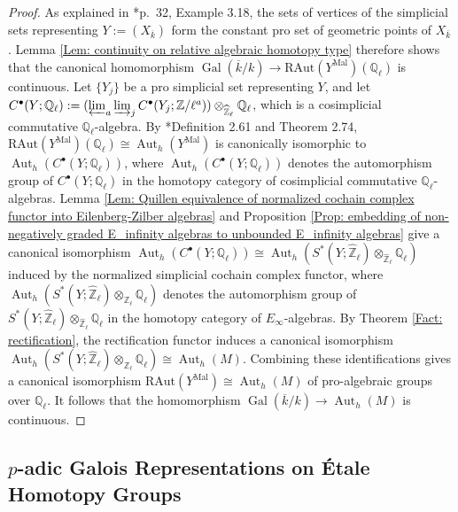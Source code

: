 \documentclass[11pt]{amsart}
\theoremstyle{definition}
\numberwithin{equation}{section}
\numberwithin{equation}{section}
\newcommand\QQ{\mathbb{Q}}
\newcommand\ZZ{\mathbb{Z}}
\DeclareMathOperator{\Aut}{Aut}
\DeclareMathOperator{\et}{\acute{e}t}
\DeclareMathOperator{\Gal}{Gal}
\begin{document}
\begin{proof}  
As explained in \cite{Pridham-Galois-actions-on-homotopy-groups-algebraic-varieties}*{p.~32, Example 3.18}, the sets of vertices of the simplicial sets representing $Y:=(X_{\overline{k}})_{\et}$ form the constant pro set of geometric points of $X_{\overline{k}}$. Lemma \ref{Lem: continuity on relative algebraic homotopy type} therefore shows that the canonical homomorphism $\Gal(\overline{k}/k)\rightarrow \mathrm{RAut}(Y^{\mathrm{Mal}})(\QQ_{\ell})$ is continuous. Let $\{Y_j\}$ be a pro simplicial set representing $Y$, and let $C^{\bullet}(Y;\QQ_{\ell}):=(\varprojlim_{a}\varinjlim_{j}C^{\bullet}(Y_j;\ZZ/\ell^{a}))\otimes_{\widehat{\ZZ}_{\ell}}\QQ_{\ell}$, which is a cosimplicial commutative $\QQ_{\ell}$-algebra. By \cite{Pridham-etale-fundamental-group-of-smooth-variety}*{Definition 2.61 and Theorem 2.74}, $\mathrm{RAut}(Y^{\mathrm{Mal}})(\QQ_{\ell})\cong \Aut_h(Y^{\mathrm{Mal}})$ is canonically isomorphic to $\Aut_h(C^{\bullet}(Y;\QQ_{\ell}))$, where $\Aut_h(C^{\bullet}(Y;\QQ_{\ell}))$ denotes the automorphism group of $C^{\bullet}(Y;\QQ_{\ell})$ in the homotopy category of cosimplicial commutative $\QQ_{\ell}$-algebras. Lemma \ref{Lem: Quillen equivalence of normalized cochain complex functor into Eilenberg-Zilber algebras} and Proposition \ref{Prop: embedding of non-negatively graded E_infinity algebras to unbounded E_infinity algebras} give a canonical isomorphism $\Aut_h(C^{\bullet}(Y;\QQ_{\ell}))\cong \Aut_h(S^{*}(Y;\widehat{\ZZ}_{\ell})\otimes_{\widehat{\ZZ}_{\ell}}\QQ_{\ell})$ induced by the normalized simplicial cochain complex functor, where $\Aut_h(S^{*}(Y;\widehat{\ZZ}_{\ell})\otimes_{\widehat{\ZZ}_{\ell}}\QQ_{\ell})$ denotes the automorphism group of $S^{*}(Y;\widehat{\ZZ}_{\ell})\otimes_{\widehat{\ZZ}_{\ell}}\QQ_{\ell}$ in the homotopy category of $E_{\infty}$-algebras. By Theorem \ref{Fact: rectification}, the rectification functor induces a canonical isomorphism $\Aut_h(S^{*}(Y;\widehat{\ZZ}_{\ell})\otimes_{\widehat{\ZZ}_{\ell}}\QQ_{\ell})\cong \Aut_h(M)$. Combining these identifications gives a canonical isomorphism $\mathrm{RAut}(Y^{\mathrm{Mal}})\cong \Aut_h(M)$ of pro-algebraic groups over $\QQ_{\ell}$. It follows that the homomorphism $\Gal(\overline{k}/k)\rightarrow \Aut_h(M)$ is continuous.
\end{proof}


\subsection{$p$-adic Galois Representations on \'Etale Homotopy Groups}\label{SubSec: Galois representation}\,
\end{document}
